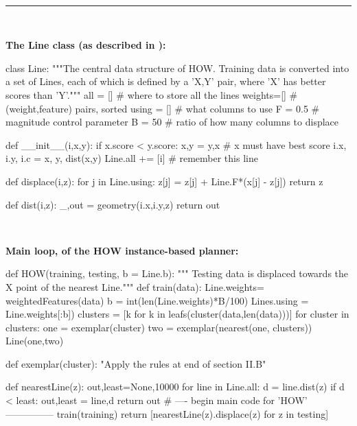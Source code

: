 

\begin{figure*} 
~\hrule~
\begin{minipage}[t]{.45\linewidth}
\scriptsize\vspace{1mm}
{\bf The Line class (as described in ):}

 
\begin{python}[left]
class Line:
  """The central data structure of HOW. Training data 
  is converted into a set of Lines, each of which is 
  defined by a 'X,Y' pair, where 'X'
  has better scores than 'Y'."""
  all   = []    # where to store all the lines
  weights=[]    # (weight,feature) pairs, sorted
  using = []    # what columns to use
  F     = 0.5   # magnitude control parameter
  B     = 50    # ratio of how many columns to displace

 def __init__(i,x,y):
    if x.score < y.score:
      x,y = y,x      # x must have best score
    i.x, i.y, i.c = x, y, dist(x,y) 
    Line.all += [i]  # remember this line

  def displace(i,z):
    for j in Line.using:
      z[j] = z[j] + Line.F*(x[j] - z[j])
    return z

  def dist(i,z):
    _,out = geometry(i.x,i.y,z)
    return out
\end{python}

~~

{\bf Main loop, of the  HOW  instance-based planner:}

\begin{python}[left]
def HOW(training, testing, b = Line.b):
  """ Testing data is displaced towards
  the X point of the nearest Line."""
  def train(data):
    Line.weights= weightedFeatures(data)
    b           = int(len(Line.weights)*B/100)
    Lines.using = Line.weights[:b])
    clusters    = [k for k in 
                   leafs(cluster(data,len(data)))]
    for cluster in clusters:
      one = exemplar(cluster)
      two = exemplar(nearest(one, clusters))
      Line(one,two)
 
   def exemplar(cluster):
    "Apply the rules at end of section II.B"
 
  def nearestLine(z):
    out,least=None,10000
    for line in Line.all:
      d = line.dist(z)
      if d < least: out,least = line,d
    return out
  # ---- begin main code for  'HOW' ---------------
  train(training)
  return [nearestLine(z).displace(z) for z in testing]
\end{python}

~~


\end{minipage}
\end{figure*}

